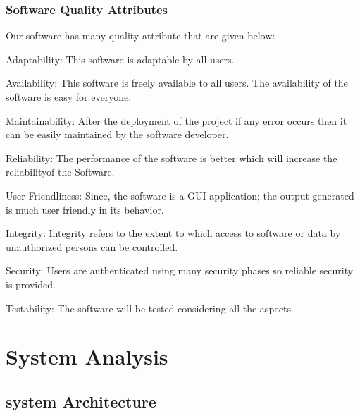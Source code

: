 \documentclass[oneside,a4paper,12pt]{report}
\begin{document}
\subsection {Software Quality Attributes}
\item  Our software has many quality attribute that are given below:-\\
\item Adaptability: This software is adaptable by all users.\\
\item Availability: This software is freely available to all users. The availability of the software is easy for everyone.\\
\item Maintainability: After the deployment of the project if any error occurs then it can be easily maintained by the software developer.\\
\item Reliability: The performance of the software is better which will increase the reliabilityof the Software.\\
\item User Friendliness: Since, the software is a GUI application; the output generated is much user friendly in its behavior.\\
\item Integrity: Integrity refers to the extent to which access to software or data by unauthorized persons can be controlled.\\
\item Security: Users are authenticated using many security phases so reliable security is provided.\\
\item Testability: The software will be tested considering all the aspects.\\
\newpage
\chapter {System Analysis}
\section {system Architecture}
\end{document}
